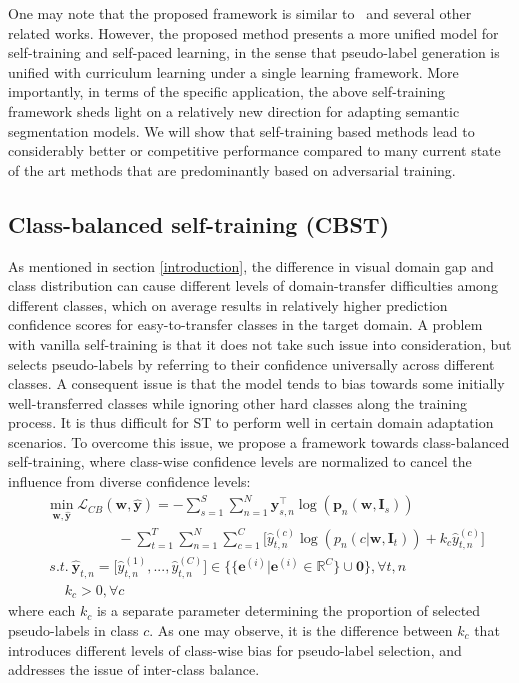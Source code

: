 \documentclass[runningheads]{llncs}
\begin{document}
One may note that the proposed framework is similar to~\cite{tang2012shifting} and several other related works. However, the proposed method presents a more unified model for self-training and self-paced learning, in the sense that pseudo-label generation is unified with curriculum learning under a single learning framework. More importantly, in terms of the specific application, the above self-training framework sheds light on a relatively new direction for adapting semantic segmentation models. We will show that self-training based methods lead to considerably better or competitive performance compared to many current state of the art methods that are predominantly based on adversarial training.

\subsection{Class-balanced self-training (CBST)}
As mentioned in section \ref{introduction}, the difference in visual domain gap and class distribution can cause different levels of domain-transfer difficulties among different classes, which on average results in relatively higher prediction confidence scores for easy-to-transfer classes in the target domain. A problem with vanilla self-training is that it does not take such issue into consideration, but selects pseudo-labels by referring to their confidence universally across different classes. A consequent issue is that the model tends to bias towards some initially well-transferred classes while ignoring other hard classes along the training process. It is thus difficult for ST to perform well in certain domain adaptation scenarios. To overcome this issue, we propose a framework towards class-balanced self-training, where class-wise confidence levels are normalized to cancel the influence from diverse confidence levels:
\begin{equation}\label{cbst}
\begin{aligned}
&\min_{\mathbf{w},\hat{\mathbf{y}}}\mathcal{L}_{CB}(\mathbf{w},\hat{\mathbf{y}}) = -\sum_{s=1}^{S}\sum_{n=1}^{N}\mathbf{y}_{s,n}^\top\log (\mathbf{p}_n(\mathbf{w},\mathbf{I}_s))\\
&~~~~~~~~~~~~~~~~~~~~~~~-\sum_{t=1}^T\sum_{n=1}^N\sum_{c=1}^C \big[\hat{y}_{t,n}^{(c)}\log(p_n(c|\mathbf{w},\mathbf{I}_t))+k_c\hat{y}_{t,n}^{(c)}\big]\\
&~s.t. ~ \hat{\mathbf{y}}_{t,n}=\big[\hat{y}_{t,n}^{(1)},...,\hat{y}_{t,n}^{(C)}\big] \in \{\{\mathbf{e}^{(i)}|\mathbf{e}^{(i)} \in \mathbb{R}^C\} \cup \mathbf{0}\}, \forall t,n\\
&~~~~~~k_c > 0, \forall c
\end{aligned}
\end{equation}
where each $k_c$ is a separate parameter determining the proportion of selected pseudo-labels in class $c$. As one may observe, it is the difference between $k_c$ that introduces different levels of class-wise bias for pseudo-label selection, and addresses the issue of inter-class balance.
\end{document}
